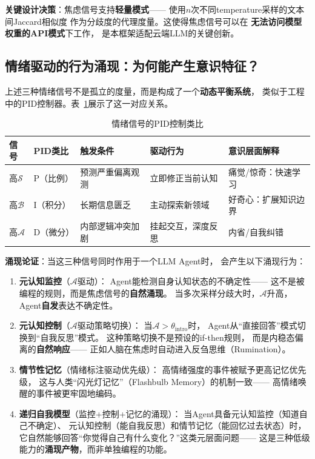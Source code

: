 \documentclass[11pt,a4paper]{article}
\newcommand{\surprise}{\mathcal{S}}
\newcommand{\boredom}{\mathcal{B}}
\newcommand{\anxiety}{\mathcal{A}}
\begin{document}
\textbf{关键设计决策}：焦虑信号支持\textbf{轻量模式}——
使用$n$次不同temperature采样的文本间Jaccard相似度
作为分歧度的代理度量。这使得焦虑信号可以在
\textbf{无法访问模型权重的API模式}下工作，
是本框架适配云端LLM的关键创新。

\subsection{情绪驱动的行为涌现：为何能产生意识特征？}

上述三种情绪信号不是孤立的度量，而是构成了一个\textbf{动态平衡系统}，
类似于工程中的PID控制器。表~\ref{tab:pid}展示了这一对应关系。

\begin{table}[htbp]
\centering
\caption{情绪信号的PID控制类比}
\label{tab:pid}
\begin{tabular}{lllll}
\toprule
信号 & PID类比 & 触发条件 & 驱动行为 & 意识层面解释 \\
\midrule
高$\surprise$ & P（比例） & 预测严重偏离观测 & 立即修正当前认知 & 痛觉/惊奇：快速学习 \\
高$\boredom$ & I（积分） & 长期信息匮乏 & 主动探索新领域 & 好奇心：扩展知识边界 \\
高$\anxiety$ & D（微分） & 内部逻辑冲突加剧 & 挂起交互，深度反思 & 内省/自我纠错 \\
\bottomrule
\end{tabular}
\end{table}

\textbf{涌现论证}：当这三种信号同时作用于一个LLM Agent时，
会产生以下涌现行为：

\begin{enumerate}[leftmargin=2em]
    \item \textbf{元认知监控}（$\anxiety$驱动）：
    Agent能检测自身认知状态的不确定性——
    这不是被编程的规则，而是焦虑信号的\textbf{自然涌现}。
    当多次采样分歧大时，$\anxiety$升高，
    Agent\textbf{自发}表达不确定性。

    \item \textbf{元认知控制}（$\anxiety$驱动策略切换）：
    当$\anxiety > \theta_{\text{intro}}$时，
    Agent从``直接回答''模式切换到``自我反思''模式。
    这种策略切换不是预设的if-then规则，
    而是内稳态偏离的\textbf{自然响应}——
    正如人脑在焦虑时自动进入反刍思维（Rumination）。

    \item \textbf{情节性记忆}（情绪标注驱动优先级）：
    高情绪强度的事件被赋予更高记忆优先级，
    这与人类``闪光灯记忆''（Flashbulb Memory）的机制一致——
    高情绪唤醒的事件被更牢固地编码。

    \item \textbf{递归自我模型}（监控+控制+记忆的涌现）：
    当Agent具备元认知监控（知道自己不确定）、
    元认知控制（能自我反思）和情节记忆（能回忆过去状态）时，
    它自然能够回答``你觉得自己有什么变化？''这类元层面问题——
    这是三种低级能力的\textbf{涌现产物}，而非单独编程的功能。
\end{enumerate}
\end{document}
